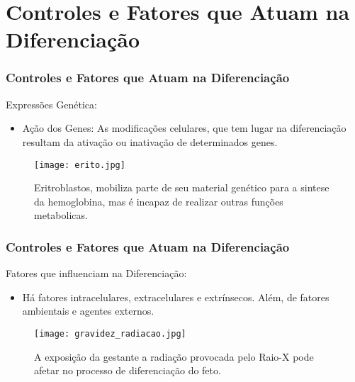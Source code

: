 \documentclass[brazil]{beamer}
\begin{document}
\section{Controles e Fatores que Atuam na Diferenciação}

\begin{frame}
  \frametitle{Controles e Fatores que Atuam na Diferenciação}
  \raggedright  
  \begin{block}{Expressões Genética:}
    \footnotesize 
      \begin{itemize}
     \item Ação dos Genes: As modificações celulares, que tem lugar na diferenciação resultam da ativação ou inativação de determinados genes. 
    \end{itemize}
    \end{block}
    \pause
    \begin{figure}
      \texttt{[image: erito.jpg]}
      \caption{\tiny Eritroblastos, mobiliza parte de seu material genético para a sintese da hemoglobina, mas é incapaz de realizar outras funções metabolicas.}
    \end{figure} 
\end{frame}

\begin{frame}
  \frametitle{Controles e Fatores que Atuam na Diferenciação}
  \raggedright
    \begin{block}{Fatores que influenciam na Diferenciação:}
    \footnotesize 
	\begin{itemize}
	  \item Há fatores intracelulares, extracelulares e extrínsecos. Além, de fatores ambientais e agentes externos.
	\end{itemize}
    \end{block}
    \pause
    
    \begin{figure}
      \texttt{[image: gravidez\_radiacao.jpg]}
      \caption{\tiny A exposição da gestante a radiação provocada pelo Raio-X pode afetar no processo de diferenciação do feto.}
    \end{figure}    
\end{frame}
\end{document}
